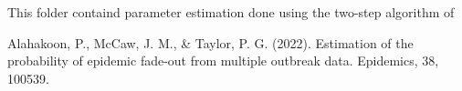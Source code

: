 This folder containd parameter estimation done using the two-step algorithm of 

Alahakoon, P., McCaw, J. M., & Taylor, P. G. (2022). Estimation of the probability of epidemic fade-out from multiple outbreak data. Epidemics, 38, 100539.
